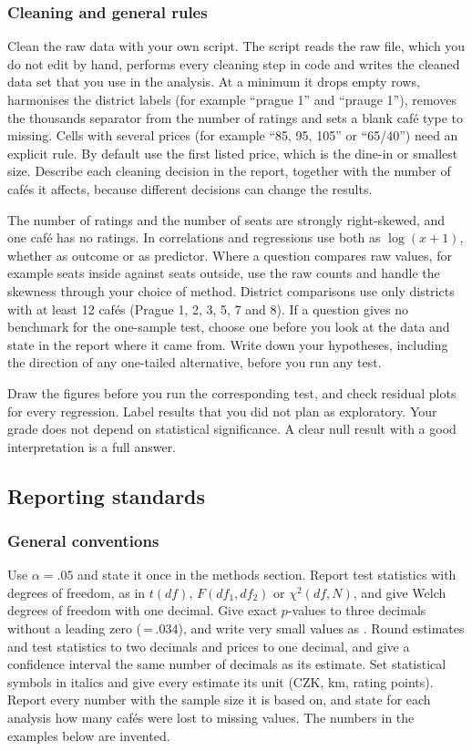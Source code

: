 \documentclass[11pt,a4paper]{article}
\begin{document}
\subsubsection*{Cleaning and general rules}

Clean the raw data with your own script. The script reads the raw file, which you do not edit by hand, performs every cleaning step in code and writes the cleaned data set that you use in the analysis. At a minimum it drops empty rows, harmonises the district labels (for example ``prague 1'' and ``prauge 1''), removes the thousands separator from the number of ratings and sets a blank caf\'e type to missing. Cells with several prices (for example ``85, 95, 105'' or ``65/40'') need an explicit rule. By default use the first listed price, which is the dine-in or smallest size. Describe each cleaning decision in the report, together with the number of caf\'es it affects, because different decisions can change the results.

The number of ratings and the number of seats are strongly right-skewed, and one caf\'e has no ratings. In correlations and regressions use both as $\log(x+1)$, whether as outcome or as predictor. Where a question compares raw values, for example seats inside against seats outside, use the raw counts and handle the skewness through your choice of method. District comparisons use only districts with at least 12 caf\'es (Prague 1, 2, 3, 5, 7 and 8). If a question gives no benchmark for the one-sample test, choose one before you look at the data and state in the report where it came from. Write down your hypotheses, including the direction of any one-tailed alternative, before you run any test.

Draw the figures before you run the corresponding test, and check residual plots for every regression. Label results that you did not plan as exploratory. Your grade does not depend on statistical significance. A clear null result with a good interpretation is a full answer.

\subsection{Reporting standards}

\subsubsection*{General conventions}

Use $\alpha=.05$ and state it once in the methods section. Report test statistics with degrees of freedom, as in $t(df)$, $F(df_1,df_2)$ or $\chi^2(df,N)$, and give Welch degrees of freedom with one decimal. Give exact $p$-values to three decimals without a leading zero (\pr\,=\,.034), and write very small values as . Round estimates and test statistics to two decimals and prices to one decimal, and give a confidence interval the same number of decimals as its estimate. Set statistical symbols in italics and give every estimate its unit (CZK, km, rating points). Report every number with the sample size it is based on, and state for each analysis how many caf\'es were lost to missing values. The numbers in the examples below are invented.
\end{document}
